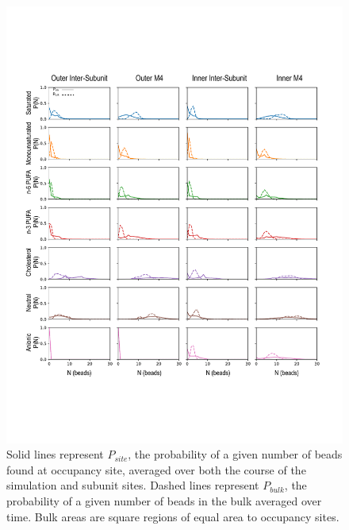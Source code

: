 \documentclass[12pt]{ruthesis_nofloat}
\begin{document}
\renewcommand{\thefigure}{D1}
\begin{figure}[!h]
	\center
	\includegraphics[width=\linewidth]{./Figures/Bead_Distributions.pdf}
	\caption[Probability distributions of acyl-chain saturations, including cholesterol, and head group charge.] {Solid lines represent $P_{site}$, the probability of a given number of beads found at occupancy site, averaged over both the course of the simulation and subunit sites. Dashed lines represent  $P_{bulk}$, the probability of a given number of beads in the bulk averaged over time. Bulk areas are square regions of equal area to occupancy sites.}
	\label{fig:lipidDist}
\end{figure}
\end{document}
